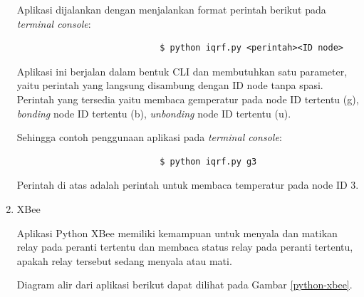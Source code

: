 \begin{enumerate}
					Aplikasi dijalankan dengan menjalankan format perintah berikut pada \emph{terminal console}:
					\begingroup
					    \fontsize{10pt}{12pt}\selectfont
					    \begin{verbatim}
					    	$ python iqrf.py <perintah><ID node>
					    \end{verbatim}  
					\endgroup

					Aplikasi ini berjalan dalam bentuk CLI dan membutuhkan satu parameter, yaitu perintah yang langsung disambung dengan ID node tanpa spasi. Perintah yang tersedia yaitu membaca gemperatur pada node ID tertentu (g), \emph{bonding} node ID tertentu (b), \emph{unbonding} node ID tertentu (u).

					Sehingga contoh penggunaan aplikasi pada \emph{terminal console}:
					\begingroup
					    \fontsize{10pt}{12pt}\selectfont
					    \begin{verbatim}
					    	$ python iqrf.py g3
					    \end{verbatim}  
					\endgroup
					Perintah di atas adalah perintah untuk membaca temperatur pada node ID 3.

				\item XBee

					Aplikasi Python XBee memiliki kemampuan untuk menyala dan matikan relay pada peranti tertentu dan membaca status relay pada peranti tertentu, apakah relay tersebut sedang menyala atau mati.

					Diagram alir dari aplikasi berikut dapat dilihat pada Gambar \ref{python-xbee}.


\end{enumerate}

